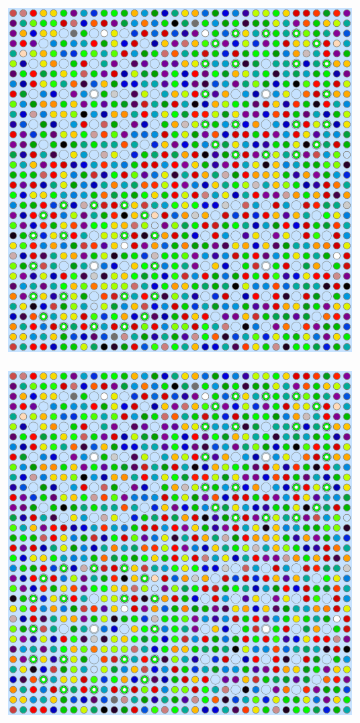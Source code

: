 \documentclass[12pt,twoside]{mitthesis-exec}
\begin{document}
\begin{figure}[h!]
\centering
\begin{subfigure}{0.47\textwidth}
  \centering
  \includegraphics[width=0.85\linewidth]{figures/quantification/homogenization/2x2-degenerate-materials}
  \caption{}
  \label{fig:2x2-degenerate}
\end{subfigure}%
\begin{subfigure}{0.47\textwidth}
  \centering
  \includegraphics[width=0.85\linewidth]{figures/quantification/homogenization/2x2-degenerate-materials}

\end{subfigure}
\end{figure}
\end{document}
